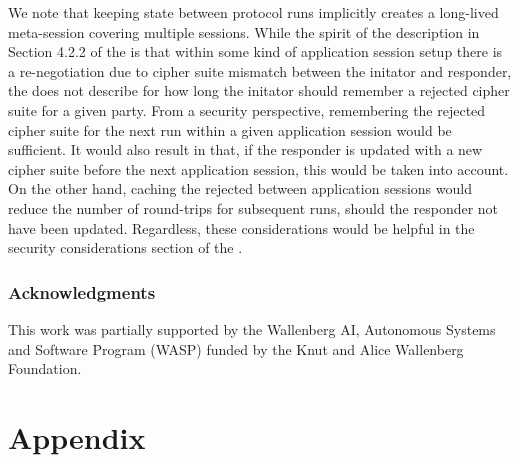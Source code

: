 \documentclass[runningheads,draft]{llncs}
\begin{document}
We note that keeping state between protocol runs implicitly creates a long-lived
meta-session covering multiple \mEdhoc{} sessions.
%
While the spirit of the description in Section 4.2.2 of the \mSpec{} is that
within some kind of application session setup there is a re-negotiation due to
cipher suite mismatch between the initator and responder, the \mSpec{} does not
describe for how long the initator should remember a rejected cipher suite for a
given party.
%
From a security perspective, remembering the rejected cipher suite for the
next \mEdhoc{} run within a given application session would be sufficient.
%
It would also result in that, if the responder is updated with a new cipher
suite before the next application session, this would be taken into account.
%
On the other hand, caching the rejected between application sessions would
reduce the number of round-trips for subsequent runs, should the responder not
have been updated.
%
Regardless, these considerations would be helpful in the security considerations
section of the \mSpec{}.
%

\subsubsection*{Acknowledgments} This work was partially supported by
the Wallenberg AI, Autonomous Systems and Software Program (WASP) funded by
the Knut and Alice Wallenberg Foundation.
%





\appendix
\section*{Appendix}


\end{document}
